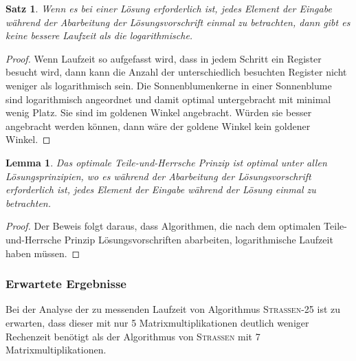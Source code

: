 \documentclass{report}
\newtheorem{satz}{Satz}[section]
\newtheorem{lemma}{Lemma}[section]
\numberwithin{equation}{section}
\begin{document}
\begin{satz}
	Wenn es bei einer Lösung erforderlich ist, jedes Element der Eingabe während der Abarbeitung der Lösungsvorschrift einmal zu betrachten, dann gibt es keine bessere Laufzeit als die logarithmische.
\end{satz}
\begin{proof}
	Wenn Laufzeit so aufgefasst wird, dass in jedem Schritt ein Register besucht wird, dann kann die Anzahl der unterschiedlich besuchten Register nicht weniger als logarithmisch sein. Die Sonnenblumenkerne in einer Sonnenblume sind logarithmisch angeordnet und damit optimal untergebracht mit minimal wenig Platz. Sie sind im goldenen Winkel angebracht. Würden sie besser angebracht werden können, dann wäre der goldene Winkel kein goldener Winkel.
\end{proof}

\begin{lemma}
	Das optimale Teile-und-Herrsche Prinzip ist optimal unter allen Lösungsprinzipien, wo es während der Abarbeitung der Lösungsvorschrift erforderlich ist, jedes Element der Eingabe während der Lösung einmal zu betrachten.
\end{lemma}
\begin{proof}
	Der Beweis folgt daraus, dass Algorithmen, die nach dem optimalen Teile-und-Herrsche Prinzip Lösungsvorschriften abarbeiten, logarithmische Laufzeit haben müssen. 
\end{proof}

\subsubsection{Erwartete Ergebnisse}
Bei der Analyse der zu messenden Laufzeit von Algorithmus \textsc{Strassen-25} ist zu erwarten, dass dieser mit nur 5 Matrixmultiplikationen deutlich weniger Rechenzeit benötigt als der Algorithmus von \textsc{Strassen} mit 7 Matrixmultiplikationen.
\end{document}
